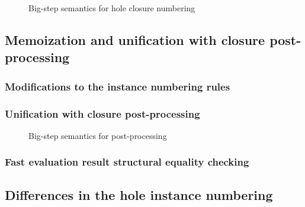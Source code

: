 \begin{figure}
  \centering
  \begin{mdframed}
    \begin{singlespace}
      
    \end{singlespace}
  \end{mdframed}
  \caption{Big-step semantics for hole closure numbering}
  \label{fig:big-step-renumber-new-rules}
\end{figure}


\subsection{Memoization and unification with closure post-processing}
\label{sec:renumbering_memoization}

\subsubsection{Modifications to the instance numbering rules}
\label{sec:memoization-instance-numbering}

\subsubsection{Unification with closure post-processing}
\label{sec:unification-postprocessing}

\begin{figure}
  \centering
  \begin{mdframed}
    \begin{singlespace}
      
    \end{singlespace}
  \end{mdframed}
  \caption{Big-step semantics for post-processing}
  \label{fig:big-step-postprocessing-rules}
\end{figure}

\subsubsection{Fast evaluation result structural equality checking}
\label{sec:fast-equals}

\subsection{Differences in the hole instance numbering}
\label{sec:differences_numbering}


